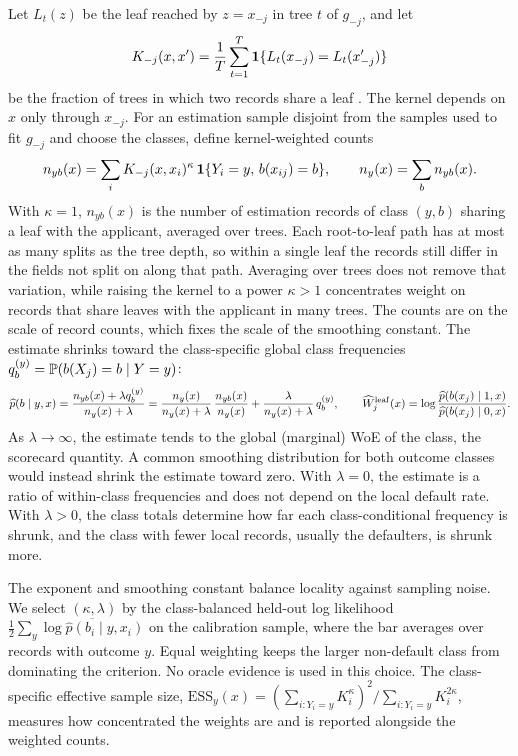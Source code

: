 Let $L_t(z)$ be the leaf reached by $z=x_{-j}$ in tree $t$ of $g_{-j}$, and let
\begin{equation}\label{eq:kernel}
K_{-j}(x,x')=\frac1T\sum_{t=1}^T\mathbf 1\{L_t(x_{-j})=L_t(x'_{-j})\}
\end{equation}
be the fraction of trees in which two records share a leaf \citep{breiman}. The kernel depends on $x$ only through $x_{-j}$. For an estimation sample disjoint from the samples used to fit $g_{-j}$ and choose the classes, define kernel-weighted counts
\begin{equation}\label{eq:counts}
n_{yb}(x)=\sum_iK_{-j}(x,x_i)^{\kappa}\,\mathbf 1\{Y_i=y,\,b(x_{ij})=b\},\qquad n_y(x)=\sum_bn_{yb}(x).
\end{equation}
With $\kappa=1$, $n_{yb}(x)$ is the number of estimation records of class $(y,b)$ sharing a leaf with the applicant, averaged over trees. Each root-to-leaf path has at most as many splits as the tree depth, so within a single leaf the records still differ in the fields not split on along that path. Averaging over trees does not remove that variation, while raising the kernel to a power $\kappa>1$ concentrates weight on records that share leaves with the applicant in many trees. The counts are on the scale of record counts, which fixes the scale of the smoothing constant. The estimate shrinks toward the class-specific global class frequencies $q^{(y)}_b=\mathbb P(b(X_j)=b\mid Y=y)$:
\begin{equation}\label{eq:leafwoe}
\widehat p(b\mid y,x)=\frac{n_{yb}(x)+\lambda q^{(y)}_b}{n_y(x)+\lambda}=\frac{n_y(x)}{n_y(x)+\lambda}\,\frac{n_{yb}(x)}{n_y(x)}+\frac{\lambda}{n_y(x)+\lambda}\,q^{(y)}_b,\qquad \widehat W_j^{\rm leaf}(x)=\log\frac{\widehat p(b(x_j)\mid1,x)}{\widehat p(b(x_j)\mid0,x)} .
\end{equation}
As $\lambda\to\infty$, the estimate tends to the global (marginal) WoE of the class, the scorecard quantity. A common smoothing distribution for both outcome classes would instead shrink the estimate toward zero. With $\lambda=0$, the estimate is a ratio of within-class frequencies and does not depend on the local default rate. With $\lambda>0$, the class totals determine how far each class-conditional frequency is shrunk, and the class with fewer local records, usually the defaulters, is shrunk more.

The exponent and smoothing constant balance locality against sampling noise. We select $(\kappa,\lambda)$ by the class-balanced held-out log likelihood $\tfrac12\sum_y\overline{\log\widehat p(b_i\mid y,x_i)}$ on the calibration sample, where the bar averages over records with outcome $y$. Equal weighting keeps the larger non-default class from dominating the criterion. No oracle evidence is used in this choice. The class-specific effective sample size, $\mathrm{ESS}_y(x)=(\sum_{i:Y_i=y}K_i^\kappa)^2/\sum_{i:Y_i=y}K_i^{2\kappa}$, measures how concentrated the weights are and is reported alongside the weighted counts.

